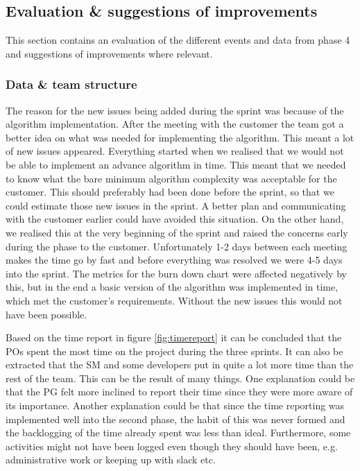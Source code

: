 \documentclass{article}
\begin{document}
\subsection{Evaluation \& suggestions of improvements}
This section contains an evaluation of the different events and data from phase 4 and suggestions of improvements where relevant.  
\subsubsection{Data \& team structure}
The reason for the new issues being added during the sprint was because of the algorithm implementation. After the meeting with the customer the team got a better idea on what was needed for implementing the algorithm. This meant a lot of new issues appeared. Everything started when we realised that we would not be able to implement an advance algorithm in time. This meant that we needed to know what the bare minimum algorithm complexity was acceptable for the customer. This should preferably had been done before the sprint, so that we could estimate those new issues in the sprint. A better plan and communicating with the customer earlier could have avoided this situation. On the other hand, we realised this at the very beginning of the sprint and raised the concerns early during the phase to the customer. Unfortunately 1-2 days between each meeting makes the time go by fast and before everything was resolved we were 4-5 days into the sprint. The metrics for the burn down chart were affected negatively by this, but in the end a basic version of the algorithm was implemented in time, which met the customer's requirements. Without the new issues this would not have been possible.

Based on the time report in figure \ref{fig:timereport} it can be concluded that the POs spent the most time on the project during the three sprints. It can also be extracted that the SM and some developers put in quite a lot more time than the rest of the team. This can be the result of many things. One explanation could be that the PG felt more inclined to report their time since they were more aware of its importance. Another explanation could be that since the time reporting was implemented well into the second phase, the habit of this was never formed and the backlogging of the time already spent was less than ideal. Furthermore, some activities might not have been logged even though they should have been, e.g. administrative work or keeping up with slack etc.
\end{document}
